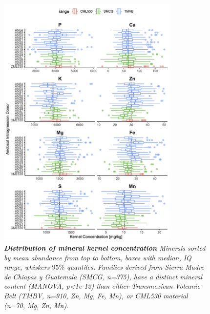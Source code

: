 \begin{figure}[!ht]
\begin{center}
\includegraphics[width=0.8\textwidth]{Chapter-4/figs/mineral_distro.png}
\caption[Distribution of mineral kernel concentration]\textit{{\textbf{Distribution of mineral kernel concentration}} Minerals sorted by mean abundance from top to bottom, boxes with median, IQ range, whiskers $95\%$ quantiles. Families derived from Sierra Madre de Chiapas y Guatemala (SMCG, n=375), have a distinct mineral content (MANOVA, p<1e-12) than either Transmexican Volcanic Belt (TMBV, n=910, Zn, Mg, Fe, Mn), or CML530 material (n=70, Mg, Zn, Mn).}
\end{center}
\label{fig:mineraldistro}
\end{figure}
\clearpage

